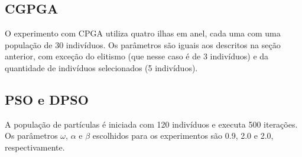 \subsection{CGPGA}

O experimento com CPGA utiliza quatro ilhas em anel, cada uma com uma população de 30 indivíduos. Os parâmetros são iguais aos descritos na seção anterior, com exceção do elitismo (que nesse caso é de 3 indivíduos) e da quantidade de indivíduos selecionados (5 indivíduos).

\subsection{PSO e DPSO}

A população de partículas é iniciada com 120 indivíduos e executa 500 iterações. Os parâmetros $\omega$, $\alpha$ e $\beta$ escolhidos para os experimentos são 0.9, 2.0 e 2.0, respectivamente.